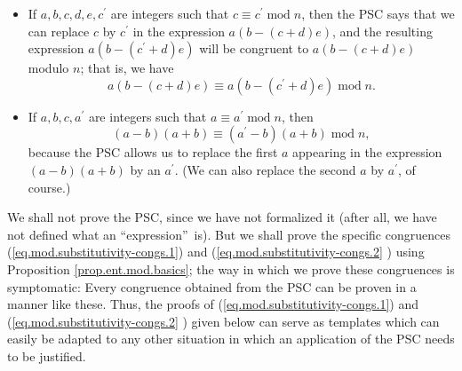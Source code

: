 \documentclass[numbers=enddot,12pt,final,onecolumn,notitlepage]{scrartcl}%
\numberwithin{exer}{subsection}
\theoremstyle{definition}
\begin{document}
\begin{itemize}
\item If $a,b,c,d,e,c^{\prime}$ are integers such that $c\equiv c^{\prime
}\operatorname{mod}n$, then the PSC says that we can replace $c$ by
$c^{\prime}$ in the expression $a\left(  b-\left(  c+d\right)  e\right)  $,
and the resulting expression $a\left(  b-\left(  c^{\prime}+d\right)
e\right)  $ will be congruent to $a\left(  b-\left(  c+d\right)  e\right)  $
modulo $n$; that is, we have%
\begin{equation}
a\left(  b-\left(  c+d\right)  e\right)  \equiv a\left(  b-\left(  c^{\prime
}+d\right)  e\right)  \operatorname{mod}n.
\label{eq.mod.substitutivity-congs.1}%
\end{equation}


\item If $a,b,c,a^{\prime}$ are integers such that $a\equiv a^{\prime
}\operatorname{mod}n$, then
\begin{equation}
\left(  a-b\right)  \left(  a+b\right)  \equiv\left(  a^{\prime}-b\right)
\left(  a+b\right)  \operatorname{mod}n, \label{eq.mod.substitutivity-congs.2}%
\end{equation}
because the PSC allows us to replace the first $a$ appearing in the expression
$\left(  a-b\right)  \left(  a+b\right)  $ by an $a^{\prime}$. (We can also
replace the second $a$ by $a^{\prime}$, of course.)
\end{itemize}

We shall not prove the PSC, since we have not formalized it (after all, we
have not defined what an \textquotedblleft expression\textquotedblright\ is).
But we shall prove the specific congruences
(\ref{eq.mod.substitutivity-congs.1}) and (\ref{eq.mod.substitutivity-congs.2}%
) using Proposition \ref{prop.ent.mod.basics}; the way in which we prove these
congruences is symptomatic: Every congruence obtained from the PSC can be
proven in a manner like these. Thus, the proofs of
(\ref{eq.mod.substitutivity-congs.1}) and (\ref{eq.mod.substitutivity-congs.2}%
) given below can serve as templates which can easily be adapted to any other
situation in which an application of the PSC needs to be justified.
\end{document}

